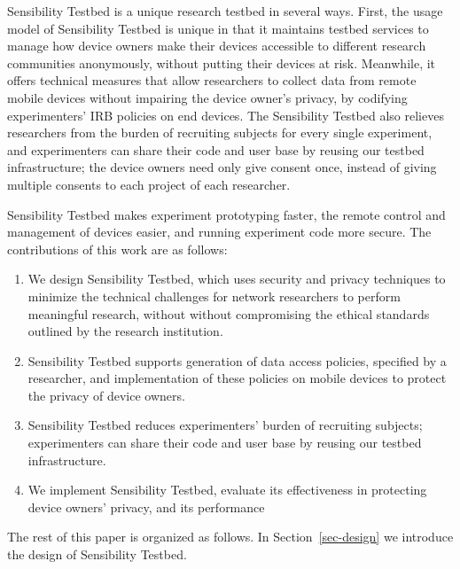 Sensibility Testbed is a unique research testbed in several ways.
First, the usage model of Sensibility Testbed is
unique in that it maintains testbed services to manage how device 
owners make their devices accessible to different research 
communities anonymously, without putting
their devices at risk. Meanwhile, it offers technical measures
that allow researchers to collect data from remote mobile
devices without impairing the device owner's privacy, by codifying 
experimenters' IRB policies on end devices. The
Sensibility Testbed also relieves researchers from the burden of
recruiting subjects for every single experiment, and 
experimenters can share their code and user base by reusing
our testbed infrastructure; the device
owners need only give consent once, instead of giving multiple
consents to each project of each researcher.

Sensibility Testbed makes experiment
prototyping faster, the remote control and management of devices
easier, and running experiment code more secure. The
contributions of this work are as follows:

\begin{enumerate}
\item We design Sensibility Testbed, which uses security and 
privacy techniques to minimize the technical challenges for 
network researchers to perform meaningful research, without 
without compromising the ethical standards outlined by the 
research institution.

\item Sensibility Testbed supports generation of data access 
policies, specified by a researcher, and implementation of 
these policies on mobile devices to protect the privacy of 
device owners.

\item Sensibility Testbed reduces experimenters' burden of 
recruiting subjects; experimenters can share their code and 
user base by reusing our testbed infrastructure.


\item We implement Sensibility Testbed, evaluate its effectiveness
in protecting device owners' privacy, and its performance 
\end{enumerate}

The rest of this paper is organized as follows. In Section~\ref{sec-design}
we introduce the design of Sensibility Testbed.